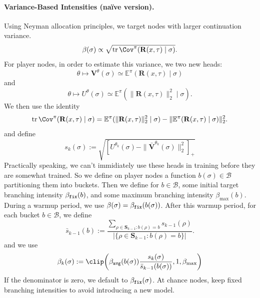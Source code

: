 \documentclass[12pt, a4paper]{article}
\begin{document}
\paragraph{Variance-Based Intensities (naïve version).}
Using Neyman allocation principles, we target nodes with larger continuation variance.
\begin{equation}\label{eq:branched-neyman-intensity}
  \beta(\sigma) \propto \sqrt{\operatorname{tr}\Cov^\pi(\mathbf{R}(x,\tau)\mid\sigma)}.
\end{equation}
For player nodes, in order to estimate this variance, we two new heads:
\begin{equation}\label{eq:V-vector-head}
  \theta
  \longmapsto
  \mathbf V^\theta(\sigma)
  \simeq
  \mathbb{E}^\pi(\mathbf{R}(x,\tau)\mid \sigma)
\end{equation}
and
\begin{equation}\label{eq:U-head}
  \theta
  \longmapsto
  U^\theta(\sigma)
  \simeq
  \mathbb{E}^\pi(\|\mathbf{R}(x,\tau)\|_2^2\mid\sigma).
\end{equation}
We then use the identity
\[
  \operatorname{tr}\Cov^\pi(\mathbf{R}(x,\tau)\mid\sigma)
  =
  \mathbb{E}^\pi(\|\mathbf{R}(x,\tau)\|_2^2\mid\sigma)
  -
  \|\mathbb{E}^\pi(\mathbf{R}(x,\tau)\mid\sigma)\|_2^2.
\]
and define
\[
  s_k(\sigma)
  :=
  \sqrt{\left[U^{\theta_k}(\sigma)-\|\bar{\mathbf V}^{\theta_k}(\sigma)\|_2^2\right]_+}
\]
Practically speaking, we can't immidiately use these heads in training before they are somewhat trained.
So we define on player nodes a function $b(\sigma) \in \mathcal{B}$ partitioning them into buckets.
Then we define for $b \in \mathcal{B}$, some initial target branching intensity $\beta_{\tt fix}(b)$, and some maximum branching intensity $\beta_{\max}(b)$.
During a warmup period, we use $\beta(\sigma) = \beta_{\tt fix}(b(\sigma))$.
After this warmup period, for each bucket $b \in \mathcal{B}$, we define
\[
  \bar s_{k-1}(b)
  :=
  \frac{\sum_{\rho\in\mathbf S_{k-1}: b(\rho)=b}s_{k-1}(\rho)}
       {\left|\{\rho\in\mathbf S_{k-1}: b(\rho)=b\}\right|}.
\]
and we use
\[
  \beta_k(\sigma)
  :=
  \clip\!\left(\beta_{\tt avg}(b(\sigma))\frac{s_k(\sigma)}{\bar s_{k-1}(b(\sigma))},1,\beta_{\max}\right)
\]
If the denominator is zero, we default to $\beta_{\tt fix}(\sigma)$.
At chance nodes, keep fixed branching intensities to avoid introducing a new model.
\end{document}
